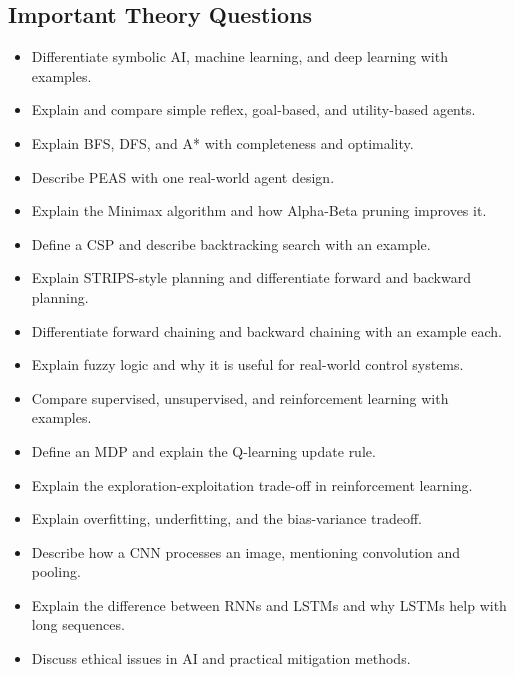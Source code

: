 \documentclass[11pt,a4paper]{article}
\begin{document}
\subsection{Important Theory Questions}
\begin{itemize}[leftmargin=*]
  \item Differentiate symbolic AI, machine learning, and deep learning with examples.
  \item Explain and compare simple reflex, goal-based, and utility-based agents.
  \item Explain BFS, DFS, and A* with completeness and optimality.
  \item Describe PEAS with one real-world agent design.
  \item Explain the Minimax algorithm and how Alpha-Beta pruning improves it.
  \item Define a CSP and describe backtracking search with an example.
  \item Explain STRIPS-style planning and differentiate forward and backward planning.
  \item Differentiate forward chaining and backward chaining with an example each.
  \item Explain fuzzy logic and why it is useful for real-world control systems.
  \item Compare supervised, unsupervised, and reinforcement learning with examples.
  \item Define an MDP and explain the Q-learning update rule.
  \item Explain the exploration-exploitation trade-off in reinforcement learning.
  \item Explain overfitting, underfitting, and the bias-variance tradeoff.
  \item Describe how a CNN processes an image, mentioning convolution and pooling.
  \item Explain the difference between RNNs and LSTMs and why LSTMs help with long sequences.
  \item Discuss ethical issues in AI and practical mitigation methods.
\end{itemize}
\end{document}
